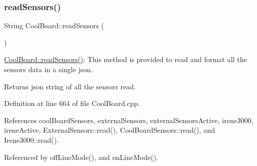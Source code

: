\subsubsection{\texorpdfstring{read\+Sensors()}{readSensors()}}
{\footnotesize\ttfamily String Cool\+Board\+::read\+Sensors (\begin{DoxyParamCaption}{ }\end{DoxyParamCaption})}

\hyperlink{classCoolBoard_ad03abdce2e65f520bbf2cff0f2d083cf}{Cool\+Board\+::read\+Sensors()}\+: This method is provided to read and format all the sensors data in a single json.

\begin{DoxyReturn}{Returns}
json string of all the sensors read. 
\end{DoxyReturn}


Definition at line 664 of file Cool\+Board.\+cpp.



References cool\+Board\+Sensors, external\+Sensors, external\+Sensors\+Active, irene3000, irene\+Active, External\+Sensors\+::read(), Cool\+Board\+Sensors\+::read(), and Irene3000\+::read().



Referenced by off\+Line\+Mode(), and on\+Line\+Mode().



